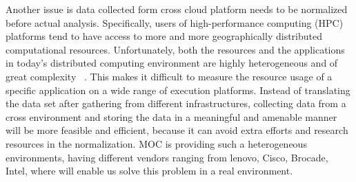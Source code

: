Another issue is data collected form cross cloud platform needs to be normalized before actual analysis. Specifically, users of high-performance computing (HPC) platforms tend to have access to more and more geographically distributed computational resources. Unfortunately, both the resources and the applications in today’s distributed computing environment are highly heterogeneous and of great complexity ~\cite{Yang2005}. This makes it difficult to measure the resource usage of a specific application on a wide range of execution platforms. Instead of translating the data set after gathering from different infrastructures, collecting data from a cross environment and storing the data in a meaningful and amenable manner will be more feasible and efficient, because it can avoid extra efforts and research resources in the normalization. MOC is providing such a heterogeneous environments, having different vendors ranging from lenovo, Cisco, Brocade, Intel, where will enable us solve this problem in a real environment.